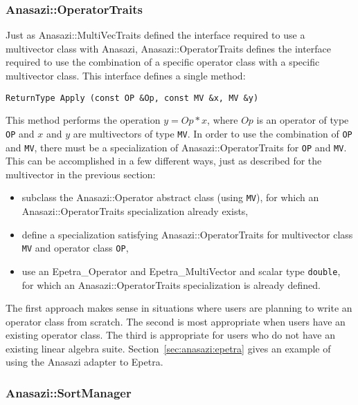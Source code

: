 \subsubsection{Anasazi::OperatorTraits}
\label{sec:anasazi:opt}

Just as Anasazi::MultiVecTraits defined the interface required to use a
multivector class with Anasazi, Anasazi::OperatorTraits defines the
interface required to use the combination of a specific operator class with a
specific multivector class. This interface defines a single method:
\begin{verbatim}
ReturnType Apply (const OP &Op, const MV &x, MV &y)
\end{verbatim}
This method performs the operation $y = Op*x$, where $Op$ is an operator of type
\verb!OP! and $x$ and $y$ are multivectors of type \verb!MV!. In order to use the
combination of \verb!OP! and \verb!MV!, there must be a specialization of
Anasazi::OperatorTraits for \verb!OP! and \verb!MV!. This can be
accomplished in a few different ways, just as described for the multivector in
the previous section:
\begin{itemize}
\item subclass the Anasazi::Operator abstract class (using
\verb!MV!), for which an Anasazi::OperatorTraits specialization already exists,
\item define a specialization satisfying Anasazi::OperatorTraits for multivector
class \verb!MV! and operator class \verb!OP!,
\item use an Epetra\_Operator and Epetra\_MultiVector and scalar
type \verb!double!, for which an Anasazi::OperatorTraits specialization is already
defined.
\end{itemize}

The first approach makes sense in situations where users are planning to write
an operator class from scratch. The second is most appropriate when users have
an existing operator class. The third is appropriate for users who do not have
an existing linear algebra suite. Section~\ref{sec:anasazi:epetra} gives an
example of using the Anasazi adapter to Epetra.

\subsubsection{Anasazi::SortManager}
\label{sec:anasazi:sm}

